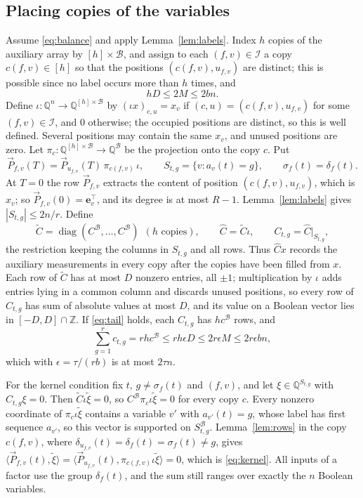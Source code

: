 \documentclass[11pt,reqno]{amsart}
\numberwithin{equation}{section}
\theoremstyle{plain}
\theoremstyle{definition}
\theoremstyle{remark}
\DeclareMathOperator{\diag}{diag}
\newcommand{\B}{\mathcal{B}}
\newcommand{\Q}{\mathbb{Q}}
\newcommand{\Z}{\mathbb{Z}}
\newcommand{\e}{\mathbf{e}}
\newcommand{\PP}{\vec{P}}
\newcommand{\ip}[2]{\langle #1,#2\rangle}
\begin{document}
\subsection{Placing copies of the variables}
Assume \eqref{eq:balance} and apply Lemma~\ref{lem:labels}. Index $h$ copies of
the auxiliary array by $[h]\times\B$, and assign to each $(f,v)\in\mathcal I$ a
copy $c(f,v)\in[h]$ so that the positions $(c(f,v),u_{f,v})$ are distinct; this is
possible since no label occurs more than $h$ times, and
\begin{equation}\label{eq:hD}
  hD\le 2M\le 2bn .
\end{equation}
Define $\iota:\Q^n\to\Q^{[h]\times\B}$ by $(\iota x)_{c,u}=x_v$ if
$(c,u)=(c(f,v),u_{f,v})$ for some $(f,v)\in\mathcal I$, and $0$ otherwise; the
occupied positions are distinct, so this is well defined. Several positions may
contain the same $x_v$, and unused positions are zero. Let
$\pi_c:\Q^{[h]\times\B}\to\Q^{\B}$ be the projection onto the copy $c$. Put
\begin{equation}\label{eq:Pfv}
  \PP_{f,v}(T)=\PP_{u_{f,v}}(T)\,\pi_{c(f,v)}\,\iota,\qquad
  S_{t,g}=\{v:a_v(t)=g\},\qquad \sigma_f(t)=\delta_f(t).
\end{equation}
At $T=0$ the row $\PP_{f,v}$ extracts the content of position $(c(f,v),u_{f,v})$,
which is $x_v$; so $\PP_{f,v}(0)=\e_v^{\top}$, and its degree is at most $R-1$.
Lemma~\ref{lem:labels} gives $|S_{t,g}|\le 2n/r$. Define
\begin{equation}\label{eq:Ctg}
  \widetilde C=\diag(C^{\B},\dots,C^{\B})\ \ (h\text{ copies}),\qquad
  \widehat C=\widetilde C\iota,\qquad C_{t,g}=\widehat C|_{S_{t,g}},
\end{equation}
the restriction keeping the columns in $S_{t,g}$ and all rows. Thus
$\widehat Cx$ records the auxiliary measurements in every copy after the copies
have been filled from $x$. Each row of $\widetilde C$ has at most $D$ nonzero
entries, all $\pm1$; multiplication by $\iota$ adds entries lying in a common
column and discards unused positions, so every row of $C_{t,g}$ has sum of
absolute values at most $D$, and its value on a Boolean vector lies in
$[-D,D]\cap\Z$. If \eqref{eq:tail} holds, each $C_{t,g}$ has $hc^{\B}$ rows, and
\begin{equation}\label{eq:ctg}
  \sum_{g=1}^{r}c_{t,g}=rhc^{\B}\le rh\epsilon D\le 2r\epsilon M\le 2r\epsilon bn,
\end{equation}
which with $\epsilon=\tau/(rb)$ is at most $2\tau n$.

For the kernel condition fix $t$, $g\ne\sigma_f(t)$ and $(f,v)$, and let
$\xi\in\Q^{S_{t,g}}$ with $C_{t,g}\xi=0$. Then $\widetilde C\iota\tilde\xi=0$, so
$C^{\B}\pi_c\iota\tilde\xi=0$ for every copy $c$. Every nonzero coordinate of
$\pi_c\iota\tilde\xi$ contains a variable $v'$ with $a_{v'}(t)=g$, whose label has
first sequence $a_{v'}$, so this vector is supported on $S^{\B}_{t,g}$.
Lemma~\ref{lem:rows} in the copy $c(f,v)$, where $\delta_{u_{f,v}}(t)=\delta_f(t)=\sigma_f(t)\ne g$,
gives $\ip{\PP_{f,v}(t)}{\tilde\xi}=\ip{\PP_{u_{f,v}}(t)}{\pi_{c(f,v)}\iota\tilde\xi}=0$,
which is \eqref{eq:kernel}. All inputs of a factor use the group $\delta_f(t)$,
and the sum still ranges over exactly the $n$ Boolean variables.
\end{document}

